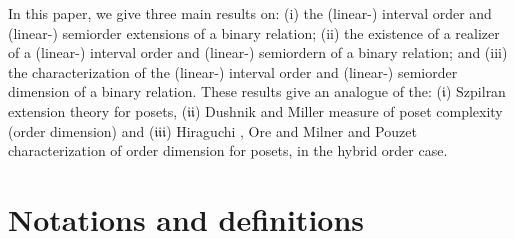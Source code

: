 \documentclass{article}
\theoremstyle{definition}
\begin{document}
In this paper, we give 
three main results on: (i) the (linear-) interval order and (linear-) semiorder extensions of a binary relation; (ii) the existence of
a realizer of a (linear-) interval order and (linear-) semiordern of a binary relation; and 
(iii) the characterization of the 
(linear-) interval order and (linear-) semiorder
dimension of a binary relation. 
These results 
give an analogue of the: ($\mathfrak{i}$) Szpilran extension theory for posets\cite{szp}, 
($\mathfrak{ii}$) Dushnik and Miller \cite{DM} measure of poset complexity (order dimension)
and ($\mathfrak{iii}$) Hiraguchi \cite{hir}, Ore \cite{ore} and Milner and Pouzet \cite{MP} characterization of 
order dimension for posets, in the hybrid order case.




\section{Notations and definitions}
\end{document}
